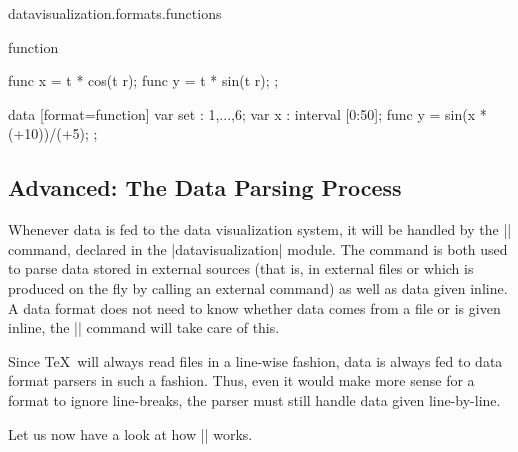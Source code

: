 \begin{tikzlibrary}{datavisualization.formats.functions}
\begin{dataformat}{function}
\begin{codeexample}[
    width=6cm,
    preamble={\usetikzlibrary{datavisualization.formats.functions}},
]
{  func x = \value t * cos(\value t r);
  func y = \value t * sin(\value t r);
};
\end{codeexample}
\begin{codeexample}[
    width=7cm,
    preamble={\usetikzlibrary{datavisualization.formats.functions}},
]
\tikz \datavisualization [
  scientific axes=clean,
  y axis={ticks={style={
        /pgf/number format/fixed,
        /pgf/number format/fixed zerofill,
        /pgf/number format/precision=2}}},
  x axis={ticks={tick suffix=${}^\circ$}},
  visualize as smooth line/.list={1,2,3,4,5,6},
  style sheet=vary hue]
data [format=function] {
  var set : {1,...,6};
  var x : interval [0:50];
  func y = sin(\value x * (\value{set}+10))/(\value{set}+5);
};
\end{codeexample}
    \end{dataformat}
\end{tikzlibrary}


\subsection{Advanced: The Data Parsing Process}
\label{section-dv-parsing}

Whenever data is fed to the data visualization system, it will be  handled by
the |\pgfdata| command, declared in the |datavisualization| module. The command
is both used to parse data stored in external sources (that is, in external
files or which is produced on the fly by calling an external command) as well
as data given inline. A data format does not need to know whether data comes
from a file or is given inline, the |\pgfdata| command will take care of this.

Since \TeX\ will always read files in a line-wise fashion, data is always fed
to data format parsers in such a fashion. Thus, even it would make more sense
for a format to ignore line-breaks, the parser must still handle data given
line-by-line.

Let us now have a look at how |\pgfdata| works.

